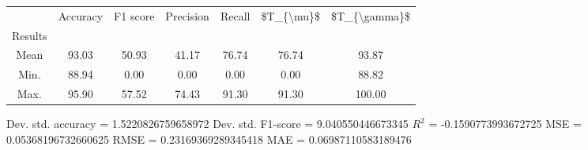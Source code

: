 \begin{tabular}{|c|c|c|c|c|c|c|}
\toprule
{} &  Accuracy &  F1 score &  Precision &  Recall &  \$T\_\{\textbackslash mu\}\$ &  \$T\_\{\textbackslash gamma\}\$ \\
Results &           &           &            &         &            &               \\
\hline
Mean    &     93.03 &     50.93 &      41.17 &   76.74 &      76.74 &         93.87 \\
Min.    &     88.94 &      0.00 &       0.00 &    0.00 &       0.00 &         88.82 \\
Max.    &     95.90 &     57.52 &      74.43 &   91.30 &      91.30 &        100.00 \\
\bottomrule
\end{tabular}

 Dev. std. accuracy = 1.5220826759658972
 Dev. std. F1-score = 9.040550446673345
 $R^2$ = -0.1590773993672725
 MSE = 0.05368196732660625
 RMSE = 0.23169369289345418
 MAE = 0.06987110583189476